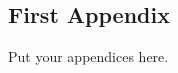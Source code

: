 \onecolumn

\appendix
\begin{appendices}

\section{First Appendix}
\label{sec:apx:first_appendix}

Put your appendices here.

\end{appendices}
